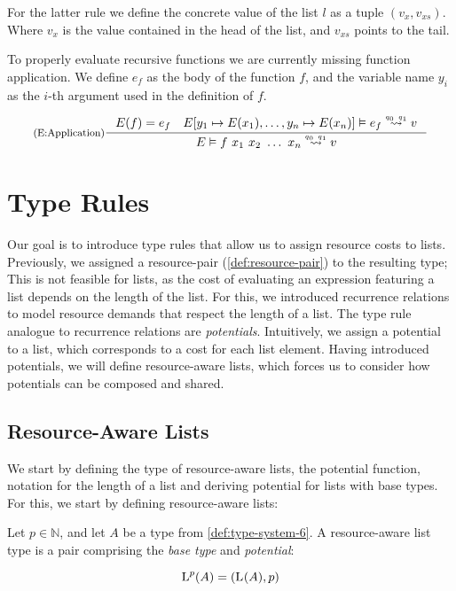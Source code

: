 For the latter rule we define the concrete value of the list \(l\) as a tuple \((v_x, v_{xs})\). Where \(v_x\) is the value contained in the head of the list, and \(v_{xs}\) points to the tail. 

To properly evaluate recursive functions we are currently missing function application. We define \(e_f\) as the body of the function \(f\), and the variable name \(y_i\) as the \(i\)-th argument used in the definition of \(f\). 

\[
   \inference[(E:Application)]
   {E(f) = e_f 
   \quad 
   \evals{E[y_1 \mapsto E(x_1), \dots, y_n \mapsto E(x_n)]}{e_f}{v}{q_0}{q_1}}
   {\evals{E}{f~x_1~x_2~\dots~x_n}{v}{q_0}{q_1}}
\]

\section{Type Rules}

Our goal is to introduce type rules that allow us to assign resource costs to lists. Previously, we assigned a resource-pair (\cref{def:resource-pair}) to the resulting type; This is not feasible for lists, as the cost of evaluating an expression featuring a list depends on the length of the list. For this, we introduced recurrence relations to model resource demands that respect the length of a list. The type rule analogue to recurrence relations are \emph{potentials}. Intuitively, we assign a potential to a list, which corresponds to a cost for each list element. Having introduced potentials, we will define resource-aware lists, which forces us to consider how potentials can be composed and shared.

\subsection{Resource-Aware Lists}\label{sec:resource-aware-lists}

We start by defining the type of resource-aware lists, the potential function, notation for the length of a list and deriving potential for lists with base types. For this, we start by defining resource-aware lists:

\begin{definition}\label{def:ra-list}
   Let \(p \in \mathbb{N}\), and let \(A\) be a type from \cref{def:type-system-6}. A resource-aware list type is a pair comprising the \emph{base type} and \emph{potential}:

   \[
      \text{L}^{p}(A) = (\text{L}^{}(A), p)
   \]
\end{definition}

